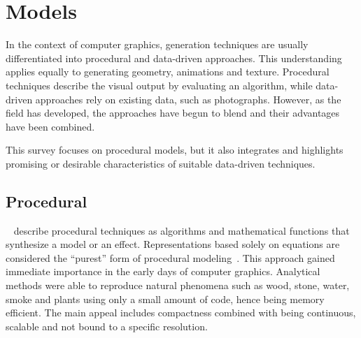 

\section{Models}
\label{sec:models}

In the context of computer graphics, generation techniques are usually differentiated into procedural and data-driven approaches. This understanding applies equally to generating geometry, animations and texture. Procedural techniques describe the visual output by evaluating an algorithm, while data-driven approaches rely on existing data, such as photographs. However, as the field has developed, the approaches have begun to blend and their advantages have been combined. 

This survey focuses on procedural models, but it also integrates and highlights promising or desirable characteristics of suitable data-driven techniques.

\subsection{Procedural}
\label{subsec:models_procedural}

\citeauthor*{ebert_2003_tmp}~\cite{ebert_2003_tmp} describe procedural techniques as algorithms and mathematical functions that synthesize a model or an effect. Representations based solely on equations are considered the ``purest'' form of procedural modeling~\cite{smelik_2014_aso}. This approach gained immediate importance in the early days of computer graphics. Analytical methods were able to reproduce natural phenomena such as wood, stone, water, smoke and plants using only a small amount of code, hence being memory efficient. The main appeal includes compactness combined with being continuous, scalable and not bound to a specific resolution.

